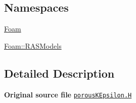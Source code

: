 \subsection*{Namespaces}
\begin{DoxyCompactItemize}
\item 
 \hyperlink{namespaceFoam}{Foam}
\item 
 \hyperlink{namespaceFoam_1_1RASModels}{Foam\+::\+R\+A\+S\+Models}
\end{DoxyCompactItemize}


\subsection{Detailed Description}
{\bfseries Original source file} \href{../../../home/carlo/data/GeN-Foam/GeN-Foam_ffn/GeN-Foam/GeN-Foam/classes/thermalHydraulics/src/physicsModels/turbulenceModels/porousKEpsilon/porousKEpsilon.H}{\tt porous\+K\+Epsilon.\+H} 